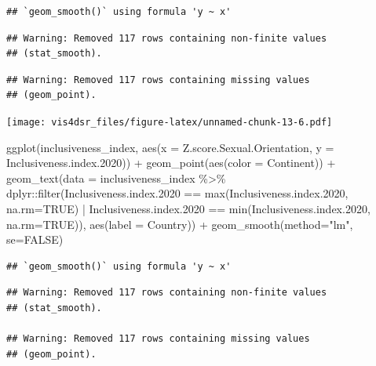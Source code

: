 \documentclass[
]{krantz}
\makeatletter
\newenvironment{Shaded}{\begin{snugshade}}{\end{snugshade}}
\newcommand{\AttributeTok}[1]{\textcolor[rgb]{0.61,0.61,0.61}{#1}}
\newcommand{\ConstantTok}[1]{\textcolor[rgb]{0,0,0}{#1}}
\newcommand{\FloatTok}[1]{\textcolor[rgb]{0.06,0.06,0.06}{#1}}
\newcommand{\FunctionTok}[1]{\textcolor[rgb]{0,0,0}{#1}}
\newcommand{\NormalTok}[1]{#1}
\newcommand{\SpecialCharTok}[1]{\textcolor[rgb]{0,0,0}{#1}}
\newcommand{\StringTok}[1]{\textcolor[rgb]{0.5,0.5,0.5}{#1}}
\newenvironment{kframe}{%
\medskip{}
\setlength{\fboxsep}{.8em}
 \def\at@end@of@kframe{}%
 \ifinner\ifhmode%
  \def\at@end@of@kframe{\end{minipage}}%
  \begin{minipage}{\columnwidth}%
 \fi\fi%
 \def\FrameCommand##1{\hskip\@totalleftmargin \hskip-\fboxsep
 \colorbox{shadecolor}{##1}\hskip-\fboxsep
     \hskip-\linewidth \hskip-\@totalleftmargin \hskip\columnwidth}%
 \MakeFramed {\advance\hsize-\width
   \@totalleftmargin\z@ \linewidth\hsize
   \@setminipage}}%
 {\par\unskip\endMakeFramed%
 \at@end@of@kframe}
\renewenvironment{Shaded}{\begin{kframe}}{\end{kframe}}
\makeatother
\begin{document}
\begin{verbatim}
## `geom_smooth()` using formula 'y ~ x'
\end{verbatim}

\begin{verbatim}
## Warning: Removed 117 rows containing non-finite values
## (stat_smooth).
\end{verbatim}

\begin{verbatim}
## Warning: Removed 117 rows containing missing values
## (geom_point).
\end{verbatim}

\texttt{[image: vis4dsr\_files/figure-latex/unnamed-chunk-13-6.pdf]}

\begin{Shaded}
\begin{Highlighting}[]
\FunctionTok{ggplot}\NormalTok{(inclusiveness\_index, }
       \FunctionTok{aes}\NormalTok{(}\AttributeTok{x =}\NormalTok{ Z.score.Sexual.Orientation, }
           \AttributeTok{y =}\NormalTok{ Inclusiveness.index}\FloatTok{.2020}\NormalTok{)) }\SpecialCharTok{+}
  \FunctionTok{geom\_point}\NormalTok{(}\FunctionTok{aes}\NormalTok{(}\AttributeTok{color =}\NormalTok{ Continent)) }\SpecialCharTok{+}
  \FunctionTok{geom\_text}\NormalTok{(}\AttributeTok{data =}\NormalTok{ inclusiveness\_index }\SpecialCharTok{\%\textgreater{}\%} 
\NormalTok{              dplyr}\SpecialCharTok{::}\FunctionTok{filter}\NormalTok{(Inclusiveness.index}\FloatTok{.2020} \SpecialCharTok{==} \FunctionTok{max}\NormalTok{(Inclusiveness.index}\FloatTok{.2020}\NormalTok{, }\AttributeTok{na.rm=}\ConstantTok{TRUE}\NormalTok{) }\SpecialCharTok{|}\NormalTok{ Inclusiveness.index}\FloatTok{.2020} \SpecialCharTok{==} \FunctionTok{min}\NormalTok{(Inclusiveness.index}\FloatTok{.2020}\NormalTok{, }\AttributeTok{na.rm=}\ConstantTok{TRUE}\NormalTok{)), }\FunctionTok{aes}\NormalTok{(}\AttributeTok{label =}\NormalTok{ Country)) }\SpecialCharTok{+}
  \FunctionTok{geom\_smooth}\NormalTok{(}\AttributeTok{method=}\StringTok{"lm"}\NormalTok{, }\AttributeTok{se=}\ConstantTok{FALSE}\NormalTok{)}
\end{Highlighting}
\end{Shaded}

\begin{verbatim}
## `geom_smooth()` using formula 'y ~ x'
\end{verbatim}

\begin{verbatim}
## Warning: Removed 117 rows containing non-finite values
## (stat_smooth).

## Warning: Removed 117 rows containing missing values
## (geom_point).
\end{verbatim}
\end{document}

